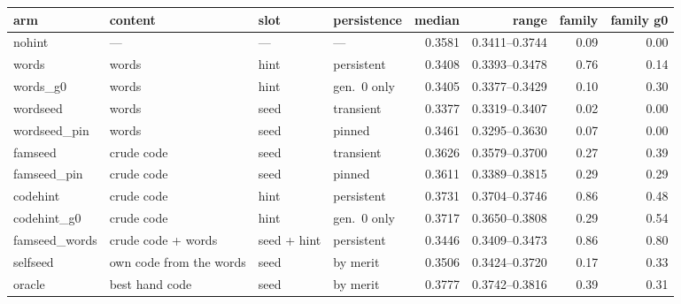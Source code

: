 \begin{tabular}{llll rrrr}
\toprule
arm & content & slot & persistence & median & range & family & family g0 \\
\midrule
nohint & --- & --- & --- & 0.3581 & 0.3411--0.3744 & 0.09 & 0.00 \\
words & words & hint & persistent & 0.3408 & 0.3393--0.3478 & 0.76 & 0.14 \\
words\_g0 & words & hint & gen.\ 0 only & 0.3405 & 0.3377--0.3429 & 0.10 & 0.30 \\
wordseed & words & seed & transient & 0.3377 & 0.3319--0.3407 & 0.02 & 0.00 \\
wordseed\_pin & words & seed & pinned & 0.3461 & 0.3295--0.3630 & 0.07 & 0.00 \\
famseed & crude code & seed & transient & 0.3626 & 0.3579--0.3700 & 0.27 & 0.39 \\
famseed\_pin & crude code & seed & pinned & 0.3611 & 0.3389--0.3815 & 0.29 & 0.29 \\
codehint & crude code & hint & persistent & 0.3731 & 0.3704--0.3746 & 0.86 & 0.48 \\
codehint\_g0 & crude code & hint & gen.\ 0 only & 0.3717 & 0.3650--0.3808 & 0.29 & 0.54 \\
famseed\_words & crude code + words & seed + hint & persistent & 0.3446 & 0.3409--0.3473 & 0.86 & 0.80 \\
selfseed & own code from the words & seed & by merit & 0.3506 & 0.3424--0.3720 & 0.17 & 0.33 \\
oracle & best hand code & seed & by merit & 0.3777 & 0.3742--0.3816 & 0.39 & 0.31 \\
\bottomrule
\end{tabular}
